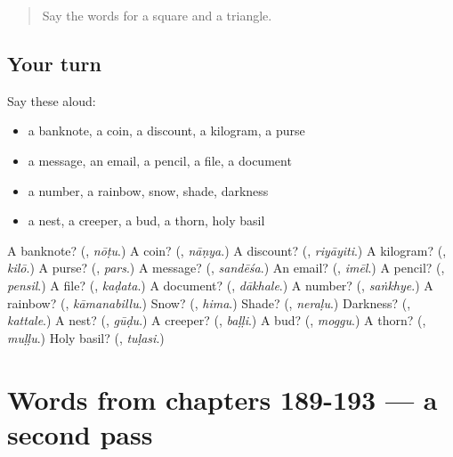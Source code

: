 \label{lesson:KA-R193-first-pass-words-from-chapters-185-188}



\begin{quote}
Say the words for a square and a triangle.
\end{quote}

\subsection*{Your turn}
Say these aloud:

\begin{itemize}
\raggedright
  \item a banknote, a coin, a discount, a kilogram, a purse
  \item a message, an email, a pencil, a file, a document
  \item a number, a rainbow, snow, shade, darkness
  \item a nest, a creeper, a bud, a thorn, holy basil
\end{itemize}

\begin{tcolorbox}[breakable,colback=teal!4,colframe=teal!35!black,title={Before you move on}]
A banknote? (\textbf{}, \emph{nōṭu}.) A coin? (\textbf{}, \emph{nāṇya}.) A discount? (\textbf{}, \emph{riyāyiti}.) A kilogram? (\textbf{}, \emph{kilō}.) A purse? (\textbf{}, \emph{pars}.) A message? (\textbf{}, \emph{sandēśa}.) An email? (\textbf{}, \emph{imēl}.) A pencil? (\textbf{}, \emph{pensil}.) A file? (\textbf{}, \emph{kaḍata}.) A document? (\textbf{}, \emph{dākhale}.) A number? (\textbf{}, \emph{saṅkhye}.) A rainbow? (\textbf{}, \emph{kāmanabillu}.) Snow? (\textbf{}, \emph{hima}.) Shade? (\textbf{}, \emph{neraḷu}.) Darkness? (\textbf{}, \emph{kattale}.) A nest? (\textbf{}, \emph{gūḍu}.) A creeper? (\textbf{}, \emph{baḷḷi}.) A bud? (\textbf{}, \emph{moggu}.) A thorn? (\textbf{}, \emph{muḷḷu}.) Holy basil? (\textbf{}, \emph{tuḷasi}.)
\end{tcolorbox}
\section[(dialogue)]{Words from chapters 189-193 — a second pass}

\label{lesson:KA-R193-second-pass-words-from-chapters-189-193}



